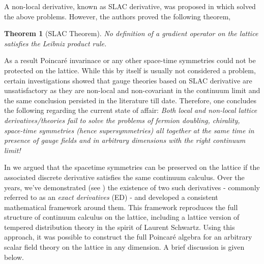 \documentclass[
article,12pt]{article}
\newtheorem{theorem}{Theorem}
\begin{document}
A non-local derivative, known as SLAC derivative, was proposed in \cite{slac} which solved the above problems. However,
the authors proved the following theorem,
\begin{theorem}[SLAC Theorem]
	No definition of a gradient operator on the lattice satisfies the Leibniz product rule.
	\label{slac-theorem}
\end{theorem}
As a result Poincaré invarinace or any other space-time symmetries could not be protected on the lattice. While this by
itself is usually not considered a problem, certain investigations \cite{karsten-smit} showed that gauge theories based
on SLAC derivative are unsatisfactory as they are non-local and non-covariant in the continuum limit and the same
conclusion persisted in the literature till date. Therefore, one concludes the following regarding the current state of
affair: \textit{Both local and non-local lattice derivatives/theories fail to solve the problems of fermion doubling, chirality, space-time symmetries (hence supersymmetries) all together at the same time in presence of gauge fields and in arbitrary dimensions with the right continuum limit!}

In \cite{covlatt1} we argued that the spacetime symmetries can be preserved on the lattice if the associated discrete derivative satisfies the same continuum calculus. Over the years, we’ve demonstrated \cite{covlatt1, covlatt2, covlatt3} (see \cite{YT}) the existence of two such derivatives - commonly referred to as an {\it exact derivatives} (ED) - and developed a consistent mathematical framework around them. This framework reproduces the full structure of continuum calculus on the lattice, including a lattice version of tempered distribution theory in the spirit of Laurent Schwartz. Using this approach, it was possible to construct the full Poincaré algebra for an arbitrary scalar field theory on the lattice in any dimension. A brief discussion is given below. 
\end{document}
